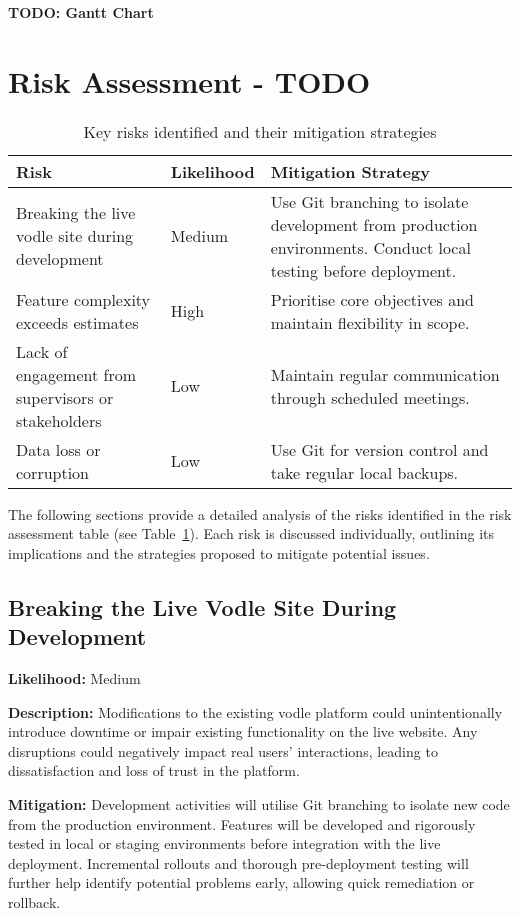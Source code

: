 \textbf{TODO: Gantt Chart}
\section{Risk Assessment - TODO}
\begin{table}[h!]
\centering
\begin{tabular}{|p{4.5cm}|p{2cm}|p{8cm}|}
\hline
\textbf{Risk} & \textbf{Likelihood} & \textbf{Mitigation Strategy} \\
\hline
Breaking the live vodle site during development & Medium & Use Git branching to isolate development from production environments. Conduct local testing before deployment. \\
\hline
Feature complexity exceeds estimates & High & Prioritise core objectives and maintain flexibility in scope. \\
\hline
Lack of engagement from supervisors or stakeholders & Low & Maintain regular communication through scheduled meetings. \\
\hline
Data loss or corruption & Low & Use Git for version control and take regular local backups. \\
\hline
\end{tabular}
\caption{Key risks identified and their mitigation strategies}\label{tab:risk-assessment}
\end{table}

The following sections provide a detailed analysis of the risks identified in the risk assessment table (see Table~\ref{tab:risk-assessment}). Each risk is discussed individually, outlining its implications and the strategies proposed to mitigate potential issues.

\subsection*{Breaking the Live Vodle Site During Development}

\textbf{Likelihood:} Medium

\textbf{Description:} Modifications to the existing vodle platform could unintentionally introduce downtime or impair existing functionality on the live website. Any disruptions could negatively impact real users' interactions, leading to dissatisfaction and loss of trust in the platform.

\textbf{Mitigation:} Development activities will utilise Git branching to isolate new code from the production environment. Features will be developed and rigorously tested in local or staging environments before integration with the live deployment. Incremental rollouts and thorough pre-deployment testing will further help identify potential problems early, allowing quick remediation or rollback.

